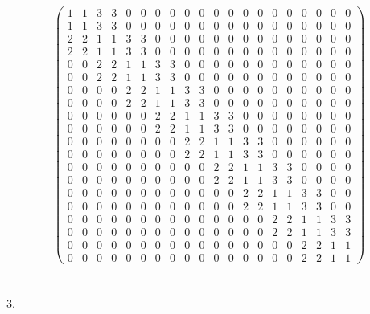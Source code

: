 \documentclass[10pt]{report}
\begin{document}
$$\left(\begin{array}{cccccccccccccccccccc} 1 & 1 & 3 & 3 & 0 & 0 & 0 & 0 & 0 & 0 & 0 & 0 & 0 & 0 & 0 & 0 & 0 & 0 & 0 & 0\\ 1 & 1 & 3 & 3 & 0 & 0 & 0 & 0 & 0 & 0 & 0 & 0 & 0 & 0 & 0 & 0 & 0 & 0 & 0 & 0\\ 2 & 2 & 1 & 1 & 3 & 3 & 0 & 0 & 0 & 0 & 0 & 0 & 0 & 0 & 0 & 0 & 0 & 0 & 0 & 0\\ 2 & 2 & 1 & 1 & 3 & 3 & 0 & 0 & 0 & 0 & 0 & 0 & 0 & 0 & 0 & 0 & 0 & 0 & 0 & 0\\ 0 & 0 & 2 & 2 & 1 & 1 & 3 & 3 & 0 & 0 & 0 & 0 & 0 & 0 & 0 & 0 & 0 & 0 & 0 & 0\\ 0 & 0 & 2 & 2 & 1 & 1 & 3 & 3 & 0 & 0 & 0 & 0 & 0 & 0 & 0 & 0 & 0 & 0 & 0 & 0\\ 0 & 0 & 0 & 0 & 2 & 2 & 1 & 1 & 3 & 3 & 0 & 0 & 0 & 0 & 0 & 0 & 0 & 0 & 0 & 0\\ 0 & 0 & 0 & 0 & 2 & 2 & 1 & 1 & 3 & 3 & 0 & 0 & 0 & 0 & 0 & 0 & 0 & 0 & 0 & 0\\ 0 & 0 & 0 & 0 & 0 & 0 & 2 & 2 & 1 & 1 & 3 & 3 & 0 & 0 & 0 & 0 & 0 & 0 & 0 & 0\\ 0 & 0 & 0 & 0 & 0 & 0 & 2 & 2 & 1 & 1 & 3 & 3 & 0 & 0 & 0 & 0 & 0 & 0 & 0 & 0\\ 0 & 0 & 0 & 0 & 0 & 0 & 0 & 0 & 2 & 2 & 1 & 1 & 3 & 3 & 0 & 0 & 0 & 0 & 0 & 0\\ 0 & 0 & 0 & 0 & 0 & 0 & 0 & 0 & 2 & 2 & 1 & 1 & 3 & 3 & 0 & 0 & 0 & 0 & 0 & 0\\ 0 & 0 & 0 & 0 & 0 & 0 & 0 & 0 & 0 & 0 & 2 & 2 & 1 & 1 & 3 & 3 & 0 & 0 & 0 & 0\\ 0 & 0 & 0 & 0 & 0 & 0 & 0 & 0 & 0 & 0 & 2 & 2 & 1 & 1 & 3 & 3 & 0 & 0 & 0 & 0\\ 0 & 0 & 0 & 0 & 0 & 0 & 0 & 0 & 0 & 0 & 0 & 0 & 2 & 2 & 1 & 1 & 3 & 3 & 0 & 0\\ 0 & 0 & 0 & 0 & 0 & 0 & 0 & 0 & 0 & 0 & 0 & 0 & 2 & 2 & 1 & 1 & 3 & 3 & 0 & 0\\ 0 & 0 & 0 & 0 & 0 & 0 & 0 & 0 & 0 & 0 & 0 & 0 & 0 & 0 & 2 & 2 & 1 & 1 & 3 & 3\\ 0 & 0 & 0 & 0 & 0 & 0 & 0 & 0 & 0 & 0 & 0 & 0 & 0 & 0 & 2 & 2 & 1 & 1 & 3 & 3\\ 0 & 0 & 0 & 0 & 0 & 0 & 0 & 0 & 0 & 0 & 0 & 0 & 0 & 0 & 0 & 0 & 2 & 2 & 1 & 1\\ 0 & 0 & 0 & 0 & 0 & 0 & 0 & 0 & 0 & 0 & 0 & 0 & 0 & 0 & 0 & 0 & 2 & 2 & 1 & 1 \end{array}\right)$$
\\~\\
{\Huge 3.}
\end{document}
